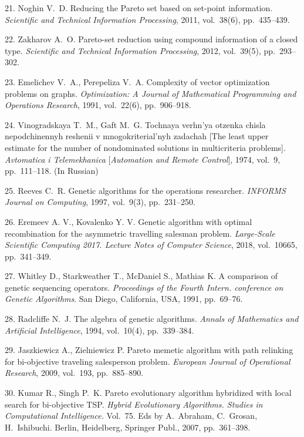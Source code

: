 {21. Noghin V.~D. Reducing the Pareto set based on set-point
information.
  \textit{Scientific and Technical Information Processing}, 2011, vol.~38(6), pp.~435--439.

22. Zakharov A.~O. Pareto-set reduction using compound information
of a closed
  type. \textit{Scientific and Technical Information Processing}, 2012, vol.~39(5), pp.~293--302.

23. Emelichev V.~A., Perepeliza V.~A. Complexity of vector
optimization problems
  on graphs. \textit{Optimization: A Journal of Mathematical Programming and Operations
  Research}, 1991, vol.~22(6), pp.~906--918.

24. Vinogradskaya T.~M., Gaft M.~G. Tochnaya verhn'ya otzenka
chisla
  nepodchinennyh reshenii v mnogokriterial'nyh zadachah [The least upper
  estimate for the number of nondominated solutions in multicriteria
  problems]. \textit{Avtomatica i Telemekhanica} [\textit{Automation and Remote Control}],
  1974, vol.~9, pp.~111--118. (In Russian)

25. Reeves C.~R. Genetic algorithms for the operations researcher.
\textit{INFORMS Journal
  on Computing}, 1997, vol.~9(3), pp.~231--250.

26. Eremeev A. V., Kovalenko Y. V. Genetic algorithm with optimal
recombination
  for the asym\-met\-ric travelling salesman problem. \textit{Large-Scale Scientific Computing 2017.
  Lecture Notes of Computer Science}, 2018, vol.~10665, pp.~341--349.

27. Whitley D., Starkweather T., McDaniel S., Mathias K. A
comparison of
  genetic sequencing operators. \textit{Proceedings of the Fourth Intern.
  conference on Genetic Algorithms}. San Diego, California, USA, 1991, pp.~69--76.

28. Radcliffe N.~J. The algebra of genetic algorithms.
\textit{Annals of Mathematics and
  Artificial Intelligence}, 1994, vol.~10(4), pp.~339--384.

29. Jaszkiewicz A., Zielniewicz P. Pareto memetic algorithm with
path relinking
  for bi-objective traveling salesperson problem. \textit{European Journal of
  Operational Research}, 2009, vol.~193, pp.~885--890.

30. Kumar R., Singh P.~K. Pareto evolutionary algorithm hybridized
with local search
  for bi-objective TSP.
  \textit{Hybrid Evolutionary Algorithms. Studies in Computational Intelligence.} Vol.~75.
  Eds by A.~Abraham, C.~Grosan, H.~Ishibuchi.
   Berlin, Heidelberg, Springer Publ., 2007, pp.~361--398.

}
